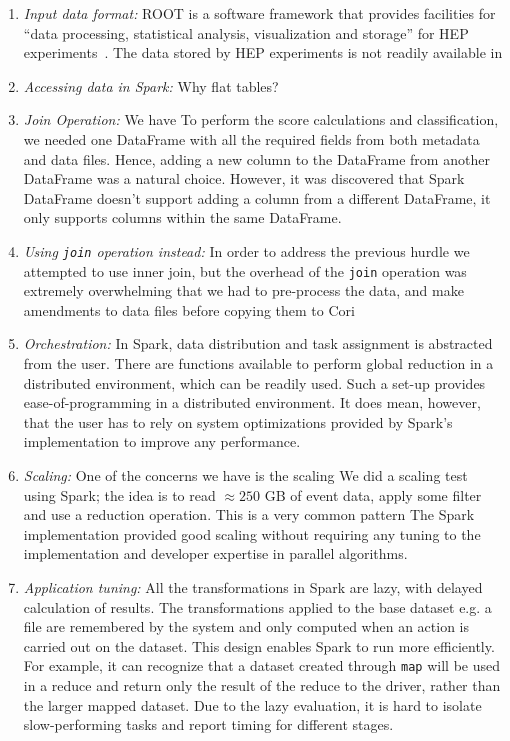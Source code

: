 \documentclass[11pt, twocolumn]{article}
\begin{document}
\begin{enumerate}
\item \textit{Input data format: } 
ROOT is a software framework that provides facilities for ``data processing, 
statistical analysis, visualization and storage'' for HEP experiments~\cite{rootweb}.
The data stored by HEP experiments is not readily available in 

\item \textit{Accessing data in Spark: }
Why flat tables? 

\item \textit{Join Operation: } We have 
To perform the score calculations and classification, we needed one DataFrame with all 
the required fields from both metadata and data files. 
Hence, adding a new column to the DataFrame from another 
DataFrame was a natural choice. However, it was discovered that Spark DataFrame 
doesn't support adding a column from a different DataFrame, it only supports columns 
within the same DataFrame. 

\item \textit{Using \texttt{join} operation instead: } 
In order to address the previous hurdle we attempted to use inner join, but the overhead of the 
\texttt{join} operation was extremely overwhelming that we had to pre-process the data, and 
make amendments to data files before copying them to Cori 

\item \textit{Orchestration: } 
In Spark, data distribution and task assignment
  is abstracted from the user. There are functions available to
  perform global reduction in a distributed environment, which can be
  readily used.  Such a set-up provides ease-of-programming in a
  distributed environment. It does mean, however, that the user has to
  rely on system optimizations provided by Spark's implementation to
  improve any performance.
 
\item \textit{Scaling: } One of the concerns we have is the scaling 
We did a scaling test using Spark; the idea is to 
read $\approx 250$ GB of event data, apply some filter and use a reduction 
operation. This is a very common pattern  The Spark implementation provided good
  scaling without requiring any tuning to the implementation and
  developer expertise in parallel algorithms.
 
\item \textit{Application tuning: } All the transformations in Spark
  are lazy, with delayed calculation of results. The transformations
  applied to the base dataset e.g. a file are remembered by the system
  and only computed when an action is carried out on the dataset.
  This design enables Spark to run more efficiently. For example, it
  can recognize that a dataset created through \texttt{map} will be
  used in a reduce and return only the result of the reduce to the
  driver, rather than the larger mapped dataset. Due to the lazy
  evaluation, it is hard to isolate slow-performing tasks and report
  timing for different stages. 


\end{enumerate}
\end{document}
